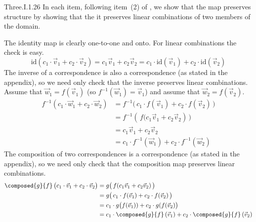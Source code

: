 \begin{ans}{Three.I.1.26}
      In each item, following item~(2) of
      , we show that the map preserves
      structure by showing that the it preserves linear combinations
      of two members of the domain.
      \begin{exparts}
        \partsitem
          The identity map is clearly one-to-one and onto.
          For linear combinations the check is easy.
          \begin{equation*}
            \mbox{id}(c_1\cdot \vec{v}_1+c_2\cdot \vec{v}_2)
             =c_1\vec{v}_1+c_2\vec{v}_2
             =c_1\cdot \mbox{id}(\vec{v}_1)+c_2\cdot \mbox{id}(\vec{v}_2)
          \end{equation*}
        \partsitem The inverse of a correspondence is also a correspondence
          (as stated in the appendix), so we need only check that the
          inverse preserves linear combinations.
          Assume that \( \vec{w}_1=f(\vec{v}_1) \)
          (so \( f^{-1}(\vec{w}_1)=\vec{v}_1 \))
          and assume that \( \vec{w}_2=f(\vec{v}_2) \).
          \begin{align*}
            f^{-1}(c_1\cdot\vec{w}_1+c_2\cdot\vec{w}_2)
              &=f^{-1}\bigl(\,c_1\cdot f(\vec{v}_1)
                             +c_2\cdot f(\vec{v}_2)\,\bigr) \\
              &=f^{-1}(\,f\bigl(c_1\vec{v}_1+c_2\vec{v}_2)\,\bigr)    \\
              &=c_1\vec{v}_1+c_2\vec{v}_2                             \\
              &=c_1\cdot f^{-1}(\vec{w}_1)+c_2\cdot f^{-1}(\vec{w}_2)
          \end{align*}
        \partsitem The composition of two correspondences is a correspondence
          (as stated in the appendix), so we need only check that the
          composition map preserves linear combinations.
          \begin{align*}
           \composed{g}{f}\,\bigl(c_1\cdot\vec{v}_1+c_2\cdot\vec{v}_2\bigr)
             &=g\bigl(\,f(c_1\vec{v}_1+c_2\vec{v}_2)\,\bigr)        \\
             &=g\bigl(\,c_1\cdot f(\vec{v}_1)+c_2\cdot f(\vec{v}_2)\,\bigr) \\
             &=c_1\cdot g\bigl(f(\vec{v}_1))+c_2\cdot g(f(\vec{v}_2)\bigr)  \\
             &=c_1\cdot\composed{g}{f}\,(\vec{v}_1)
                  +c_2\cdot\composed{g}{f}\,(\vec{v}_2)
          \end{align*}
      \end{exparts}
     
\end{ans}
